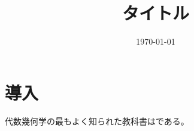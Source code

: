 \documentclass[uplatex, a4paper, dvipdfmx]{jsarticle}
\title{タイトル}
\author{}
\date{\today}
\theoremstyle{definition}
\begin{document}
\maketitle
\section{導入}
代数幾何学の最もよく知られた教科書は\cite{MR0463157}である。

\printbibliography[title=参考文献]
\end{document}
